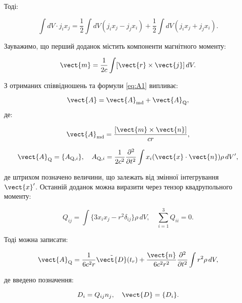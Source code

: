 Тоді:

\begin{equation*}
	\int dV \cdot j_i x_j = \frac{1}{2} \int dV (j_i x_j - j_j x_i) + \frac{1}{2} \int dV (j_i x_j + j_j x_i).
\end{equation*}

Зауважимо, що перший доданок містить компоненти магнітного моменту:

\begin{equation*}
	\vect{m} = \frac{1}{2c} \int [\vect{r} \times \vect{j}] \, dV.
\end{equation*}

З отриманих співвідношень та формули \eqref{eq:A1} випливає:

\begin{equation*}
	\vect{A} = \vect{A}_\text{md} + \vect{A}_\text{Q},
\end{equation*}
де:

\begin{equation}
	\vect{A}_\text{md} = \frac{[\vect{m} \times \vect{n}]}{c r},
	\label{eq:magnetic_dipole_potential}
\end{equation}

\begin{equation}
	\vect{A}_\text{Q} = \{A_{\text{Q},i}\}, \quad A_{\text{Q},i} = \frac{1}{2c^2} \frac{\partial^2}{\partial t^2} \int x_i (\vect{x} \cdot \vect{n})
	\rho \, dV',
	\label{eq:quadrupole_potential}
\end{equation}

де штрихом позначено величини, що залежать від змінної інтегрування \( \vect{x}' \). Останній доданок можна виразити через тензор квадрупольного моменту:

\begin{equation}
	Q_{ij} = \int \{3x_i x_j - r^2 \delta_{ij}\} \rho \, dV, \quad \sum_{i=1}^3 Q_{ii} = 0.
	\label{eq:quadrupole_tensor}
\end{equation}

Тоді можна записати:

\begin{equation}\label{eq:Quadrupole_potential}
\vect{A}_\text{Q} = \frac{1}{6c^2 r} \tilde{\vect{D}}(t_r) + \frac{\vect{n}}{6c^2 r^2} \frac{\partial^2}{\partial t^2} \int r^2 \rho \, dV,
\end{equation}

де введено позначення:

\begin{equation}
D_i = Q_{ij} n_j, \quad \vect{D} = \{D_i\}.
\label{eq:quadrupole_vector}
\end{equation}


